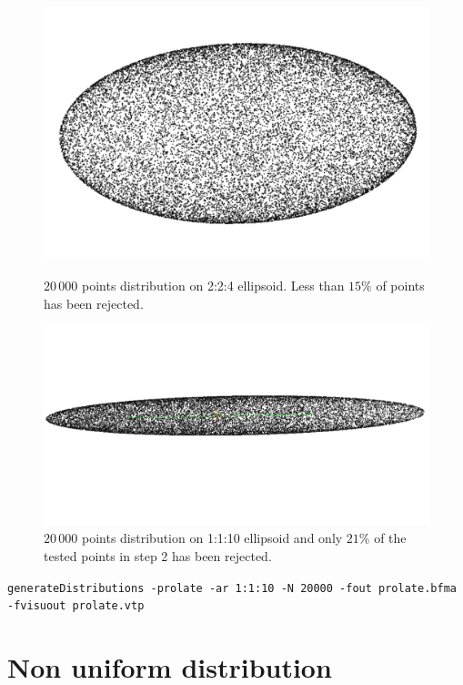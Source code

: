 \documentclass[10pt]{article}
\begin{document}
\begin{figure}[h]
  \centering
  \begin{minipage}{0.45\textwidth}%
   \includegraphics[width=1.0\textwidth]{ellipsoidUnif}
    \caption{$20\,000$ points distribution on 2:2:4 ellipsoid. Less than $15 \%$ of points has been rejected.}%
      \end{minipage}%
  \qquad
  \begin{minipage}{0.45\textwidth}%
   \includegraphics[width=1.2\textwidth]{prolate}
    \caption{$20\,000$ points distribution on 1:1:10 ellipsoid and only $21\%$ of the tested points in step 2 has been rejected.}%
  \end{minipage}%
\end{figure}

\texttt{generateDistributions -prolate -ar 1:1:10   -N 20000 -fout prolate.bfma -fvisuout prolate.vtp}



\section{Non uniform distribution}
\end{document}
